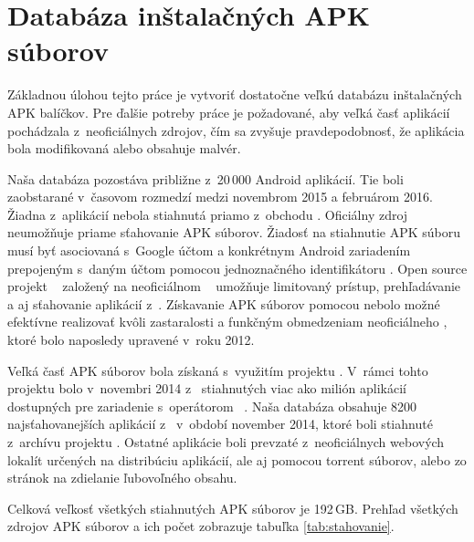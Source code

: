 \chapter{Databáza inštalačných APK súborov}
Základnou úlohou tejto práce je vytvoriť dostatočne veľkú databázu inštalačných APK balíčkov. Pre ďalšie potreby práce je požadované, aby veľká časť aplikácií pochádzala z~neoficiálnych zdrojov, čím sa zvyšuje pravdepodobnosť, že aplikácia bola modifikovaná alebo obsahuje malvér.

Naša databáza pozostáva približne z~20\,000 Android aplikácií. Tie boli zaobstarané v~časovom rozmedzí medzi novembrom 2015 a februárom 2016. Žiadna z~aplikácií nebola stiahnutá priamo z~obchodu . Oficiálny zdroj  neumožňuje priame sťahovanie APK súborov. Žiadosť na stiahnutie APK súboru musí byť asociovaná s~Google účtom a konkrétnym Android zariadením prepojeným s~daným účtom pomocou jednoznačného identifikátoru . Open source projekt ~\cite{gpCrawler} založený na neoficiálnom ~\cite{gpApi} umožňuje limitovaný prístup, prehľadávanie a aj sťahovanie aplikácií z~. Získavanie APK súborov pomocou  nebolo možné efektívne realizovať kvôli zastaralosti a funkčným obmedzeniam neoficiálneho , ktoré bolo naposledy upravené v~roku 2012.

Veľká časť APK súborov bola získaná s~využitím projektu . V~rámci tohto projektu bolo v~novembri 2014 z~ stiahnutých viac ako milión aplikácií dostupných pre zariadenie  s~operátorom ~\cite{Viennot2014}. Naša databáza obsahuje 8200 najsťahovanejších aplikácií z~ v~období november 2014, ktoré boli stiahnuté z~archívu projektu . Ostatné aplikácie boli prevzaté z~neoficiálnych webových lokalít určených na distribúciu aplikácií, ale aj pomocou torrent súborov, alebo zo stránok na zdielanie ľubovoľného obsahu.

Celková veľkosť všetkých stiahnutých APK súborov je 192\,GB. Prehľad všetkých zdrojov APK súborov a ich počet zobrazuje tabuľka \ref{tab:stahovanie}. 


